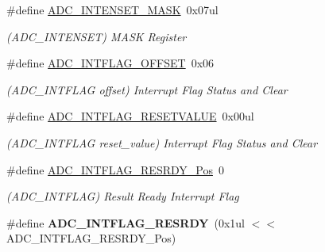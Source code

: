 \begin{DoxyCompactItemize}
\item 
\hypertarget{group___s_a_m_l21___a_d_c_ga348d47953ac9de47b878dd220e6359fd}{}\#define \hyperlink{group___s_a_m_l21___a_d_c_ga348d47953ac9de47b878dd220e6359fd}{A\+D\+C\+\_\+\+I\+N\+T\+E\+N\+S\+E\+T\+\_\+\+M\+A\+S\+K}~0x07ul\label{group___s_a_m_l21___a_d_c_ga348d47953ac9de47b878dd220e6359fd}

\begin{DoxyCompactList}\small\item\em (A\+D\+C\+\_\+\+I\+N\+T\+E\+N\+S\+E\+T) M\+A\+S\+K Register \end{DoxyCompactList}\item 
\hypertarget{group___s_a_m_l21___a_d_c_gafd3a9b4fec2824771e0a977b66bf9403}{}\#define \hyperlink{group___s_a_m_l21___a_d_c_gafd3a9b4fec2824771e0a977b66bf9403}{A\+D\+C\+\_\+\+I\+N\+T\+F\+L\+A\+G\+\_\+\+O\+F\+F\+S\+E\+T}~0x06\label{group___s_a_m_l21___a_d_c_gafd3a9b4fec2824771e0a977b66bf9403}

\begin{DoxyCompactList}\small\item\em (A\+D\+C\+\_\+\+I\+N\+T\+F\+L\+A\+G offset) Interrupt Flag Status and Clear \end{DoxyCompactList}\item 
\hypertarget{group___s_a_m_l21___a_d_c_ga834970e3bd57aba06d98614a474f4674}{}\#define \hyperlink{group___s_a_m_l21___a_d_c_ga834970e3bd57aba06d98614a474f4674}{A\+D\+C\+\_\+\+I\+N\+T\+F\+L\+A\+G\+\_\+\+R\+E\+S\+E\+T\+V\+A\+L\+U\+E}~0x00ul\label{group___s_a_m_l21___a_d_c_ga834970e3bd57aba06d98614a474f4674}

\begin{DoxyCompactList}\small\item\em (A\+D\+C\+\_\+\+I\+N\+T\+F\+L\+A\+G reset\+\_\+value) Interrupt Flag Status and Clear \end{DoxyCompactList}\item 
\hypertarget{group___s_a_m_l21___a_d_c_gaceaa92b773ddec31eebac84ace833e60}{}\#define \hyperlink{group___s_a_m_l21___a_d_c_gaceaa92b773ddec31eebac84ace833e60}{A\+D\+C\+\_\+\+I\+N\+T\+F\+L\+A\+G\+\_\+\+R\+E\+S\+R\+D\+Y\+\_\+\+Pos}~0\label{group___s_a_m_l21___a_d_c_gaceaa92b773ddec31eebac84ace833e60}

\begin{DoxyCompactList}\small\item\em (A\+D\+C\+\_\+\+I\+N\+T\+F\+L\+A\+G) Result Ready Interrupt Flag \end{DoxyCompactList}\item 
\hypertarget{group___s_a_m_l21___a_d_c_ga4ae8ec126f3771d5bbc4efce93cacf9c}{}\#define {\bfseries A\+D\+C\+\_\+\+I\+N\+T\+F\+L\+A\+G\+\_\+\+R\+E\+S\+R\+D\+Y}~(0x1ul $<$$<$ A\+D\+C\+\_\+\+I\+N\+T\+F\+L\+A\+G\+\_\+\+R\+E\+S\+R\+D\+Y\+\_\+\+Pos)\label{group___s_a_m_l21___a_d_c_ga4ae8ec126f3771d5bbc4efce93cacf9c}


\end{DoxyCompactItemize}
